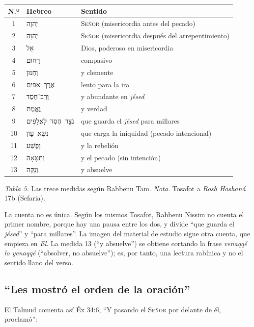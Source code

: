 \documentclass[11pt,letterpaper]{article}
\newcommand{\heb}[1]{\mbox{\foreignlanguage{hebrew}{#1}}}
\newcommand{\SENOR}{\textsc{Señor}}
\begin{document}
\begin{center}\small\renewcommand{\arraystretch}{1.15}
\begin{tabular}{@{}cL{4.2cm}L{5.8cm}@{}}
\toprule
\textbf{N.º} & \textbf{Hebreo} & \textbf{Sentido} \\  & \heb{יְהוָה} & \SENOR{} (misericordia antes del pecado) \\
2 & \heb{יְהוָה} & \SENOR{} (misericordia después del arrepentimiento) \\
3 & \heb{אֵל} & Dios, poderoso en misericordia \\
4 & \heb{רַחוּם} & compasivo \\
5 & \heb{וְחַנּוּן} & y clemente \\
6 & \heb{אֶרֶךְ אַפַּיִם} & lento para la ira \\
7 & \heb{וְרַב־חֶסֶד} & y abundante en \emph{jésed} \\
8 & \heb{וֶאֱמֶת} & y verdad \\
9 & \heb{נֹצֵר חֶסֶד לָאֲלָפִים} & que guarda el \emph{jésed} para millares \\
10 & \heb{נֹשֵׂא עָוֹן} & que carga la iniquidad (pecado intencional) \\
11 & \heb{וָפֶשַׁע} & y la rebelión \\
12 & \heb{וְחַטָּאָה} & y el pecado (sin intención) \\
13 & \heb{וְנַקֵּה} & y absuelve \\
\bottomrule
\end{tabular}\par
{\footnotesize\color{gris}\textit{Tabla 5.} Las trece medidas según Rabbenu Tam. \textit{Nota.} Tosafot a \emph{Rosh Hashaná} 17b (Sefaria).}
\end{center}

\begin{nota}[Precisión]
La cuenta no es única. Según los mismos Tosafot, Rabbenu Nissim no cuenta el primer nombre, porque hay una pausa entre los dos, y divide ``que guarda el \emph{jésed}'' y ``para millares''. La imagen del material de estudio sigue otra cuenta, que empieza en \emph{El}. La medida 13 (``y absuelve'') se obtiene cortando la frase \emph{venaqqé lo yenaqqé} (``absolver, no absuelve''); es, por tanto, una lectura rabínica y no el sentido llano del verso.
\end{nota}

\subsection{``Les mostró el orden de la oración''}
El Talmud comenta así Éx 34:6, ``Y pasando el \SENOR{} por delante de él, proclamó'':
\end{document}
